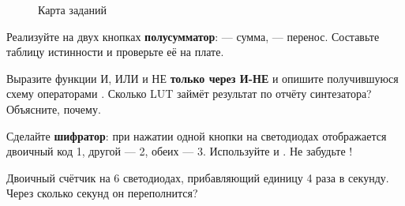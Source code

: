 \begin{figure}[H]
\centering
{}
\caption{Карта заданий}
\end{figure}

\begin{taskbox}
Реализуйте на двух кнопках \textbf{полусумматор}:  --- сумма,
 --- перенос. Составьте таблицу истинности и проверьте её на плате.
\end{taskbox}

\begin{taskbox}
Выразите функции И, ИЛИ и НЕ \textbf{только через И-НЕ} и опишите получившуюся
схему операторами . Сколько LUT займёт
результат по отчёту синтезатора? Объясните, почему.
\end{taskbox}

\begin{taskbox}
Сделайте \textbf{шифратор}: при нажатии одной кнопки на светодиодах
отображается двоичный код 1, другой --- 2, обеих --- 3. Используйте
 и . Не забудьте !
\end{taskbox}

\begin{taskbox}
Двоичный счётчик на 6 светодиодах, прибавляющий единицу 4 раза в секунду.
Через сколько секунд он переполнится?
\end{taskbox}

